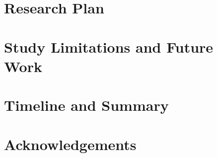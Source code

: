 \documentclass[12pt]{article} %
\begin{document}
\section{Research Plan}
\label{sec:research_plan}




\section{Study Limitations and Future Work}
\label{sec:limitations}


\section{Timeline and Summary}
\label{sec:timeline}


\section{Acknowledgements}
\label{sec:acknowledgements}




\newpage


\end{document}
